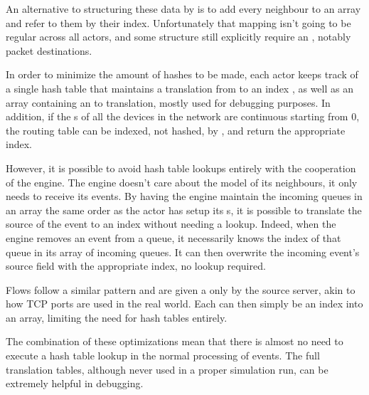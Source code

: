 An alternative to structuring these data by  is to add every neighbour to an array and refer to them by their index.
Unfortunately that mapping isn't going to be regular across all actors, and some structure still explicitly require an , notably packet destinations.

In order to minimize the amount of hashes to be made, each actor keeps track of a single hash table that maintains a translation from  to an index , as well as an array containing an  to  translation, mostly used for debugging purposes.
In addition, if the s of all the devices in the network are continuous starting from 0, the routing table can be indexed, not hashed, by , and return the appropriate index.

However, it is possible to avoid hash table lookups entirely with the cooperation of the engine.
The engine doesn't care about the model  of its neighbours, it only needs to receive its events.
By having the engine maintain the incoming queues in an array the same order as the actor has setup its s, it is possible to translate the source  of the event to an index without needing a lookup.
Indeed, when the engine removes an event from a queue, it necessarily knows the index of that queue in its array of incoming queues.
It can then overwrite the incoming event's source field with the appropriate index, no lookup required.

Flows follow a similar pattern and are given a  only by the source server, akin to how TCP ports are used in the real world.
Each  can then simply be an index into an array, limiting the need for hash tables entirely.

The combination of these optimizations mean that there is almost no need to execute a hash table lookup in the normal processing of events.
The full translation tables, although never used in a proper simulation run, can be extremely helpful in debugging.

